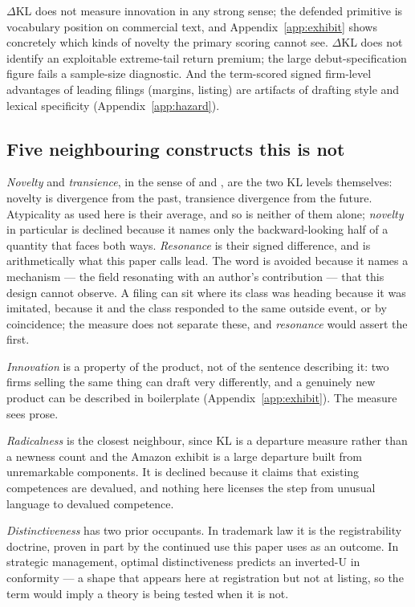 \documentclass[11pt]{article}
\newcommand{\dkl}{$\Delta$KL}
\begin{document}
\dkl{} does not measure innovation in any
strong sense; the defended primitive is vocabulary position on
commercial text, and Appendix~\ref{app:exhibit} shows concretely which
kinds of novelty the primary scoring cannot see. \dkl{} does not
identify an exploitable extreme-tail return premium; the large
debut-specification figure fails a sample-size diagnostic. And the
term-scored signed firm-level advantages of leading filings
(margins, listing) are artifacts of drafting style and lexical
specificity (Appendix~\ref{app:hazard}).

\subsection{Five neighbouring constructs this is not}

\emph{Novelty} and \emph{transience}, in the sense of
\citet{Murdock2017} and \citet{Barron2018}, are the two KL levels
themselves: novelty is divergence from the past, transience divergence
from the future. Atypicality as used here is their average, and so is
neither of them alone; \emph{novelty} in particular is declined because it
names only the backward-looking half of a quantity that faces both ways.
\emph{Resonance} is their signed difference, and is arithmetically what
this paper calls lead. The word is avoided because it names a
mechanism --- the field resonating with an author's contribution --- that
this design cannot observe. A filing can sit where its class was heading
because it was imitated, because it and the class responded to the same
outside event, or by coincidence; the measure does not separate these,
and \emph{resonance} would assert the first.

\emph{Innovation} is a property of the product, not of the sentence
describing it: two firms selling the same thing can draft very differently,
and a genuinely new product can be described in boilerplate
(Appendix~\ref{app:exhibit}). The measure sees prose.

\emph{Radicalness} \citep{DewarDutton1986, TushmanAnderson1986,
HendersonClark1990} is the closest neighbour, since KL is a departure
measure rather than a newness count and the Amazon exhibit is a large
departure built from unremarkable components. It is declined because it
claims that existing competences are devalued, and nothing here licenses the
step from unusual language to devalued competence.

\emph{Distinctiveness} has two prior occupants. In trademark law it is the
registrability doctrine, proven in part by the continued use this paper uses
as an outcome. In strategic management, optimal distinctiveness
\citep{Zhao2017} predicts an inverted-U in conformity --- a shape that
appears here at registration but not at listing, so the term would imply a
theory is being tested when it is not.
\end{document}
